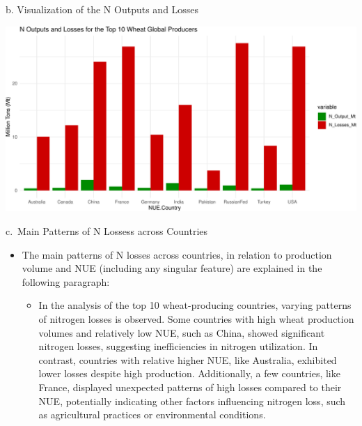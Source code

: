 \documentclass[
  ignorenonframetext,
  aspectratio=169,
]{beamer}
\providecommand{\tightlist}{%
  \setlength{\itemsep}{0pt}\setlength{\parskip}{0pt}}\usepackage{longtable,booktabs,array}
\begin{document}
\begin{frame}{b. Visualization of the N Outputs and Losses}
\protect\hypertarget{b.-visualization-of-the-n-outputs-and-losses}{}
\linespread{0.5}

\includegraphics{global_n_files/figure-beamer/unnamed-chunk-15-1.pdf}

\linespread{2}
\end{frame}

\begin{frame}{c.~Main Patterns of N Lossess across Countries}
\protect\hypertarget{c.-main-patterns-of-n-lossess-across-countries}{}
\begin{itemize}[<+->]
\item
  The main patterns of N losses across countries, in relation to
  production volume and NUE (including any singular feature) are
  explained in the following paragraph:

  \begin{itemize}[<+->]
  \tightlist
  \item
    In the analysis of the top 10 wheat-producing countries, varying
    patterns of nitrogen losses is observed. Some countries with high
    wheat production volumes and relatively low NUE, such as China,
    showed significant nitrogen losses, suggesting inefficiencies in
    nitrogen utilization. In contrast, countries with relative higher
    NUE, like Australia, exhibited lower losses despite high production.
    Additionally, a few countries, like France, displayed unexpected
    patterns of high losses compared to their NUE, potentially
    indicating other factors influencing nitrogen loss, such as
    agricultural practices or environmental conditions.
  \end{itemize}
\end{itemize}
\end{frame}
\end{document}
